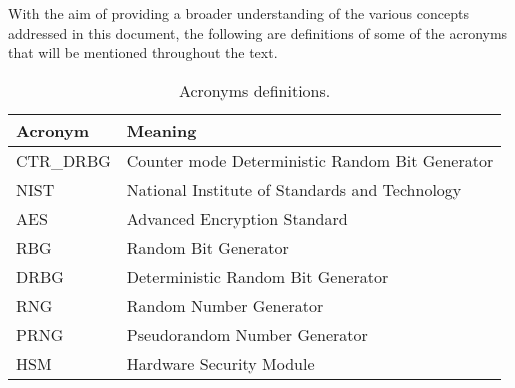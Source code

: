 \noindent
With the aim of providing a broader understanding of the various concepts addressed in this document, the following are definitions of some of the acronyms that will be mentioned throughout the text.

\begin{table}[h!]
\centering
\begin{tabular}{@{}ll@{}}
\toprule
\textbf{Acronym} & \textbf{Meaning} \\ \midrule
CTR\_DRBG & Counter mode Deterministic Random Bit Generator \\
NIST & National Institute of Standards and Technology \\
AES & Advanced Encryption Standard \\
RBG & Random Bit Generator \\
DRBG & Deterministic Random Bit Generator \\
RNG & Random Number Generator \\
PRNG & Pseudorandom Number Generator \\ 
HSM & Hardware Security Module \\ \bottomrule
\end{tabular}
\caption{Acronyms definitions.}
\label{tab:acronyms}
\end{table}
